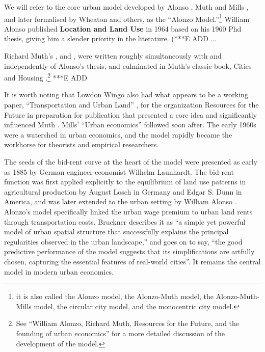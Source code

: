 We will refer to the core urban model developed by Alonso \cite{alonsoLocationLandUse1964}, Muth \cite{muthCitiesHousingSpatial1969} and Mills \cite{millsAggregativeModelResource1967}, and later formalised by Wheaton \cite{wheatonComparativeStaticAnalysis1974} and others, as the ``Alonzo Model.''\footnote{it is also called the Alonzo model, the Alonzo-Muth model, the Alonzo-Muth-Mills model, the circular city model, and the monocentric city model.} William Alonso published \textbf{Location and Land Use} in 1964  \cite{alonsoLocationLandUse1964} based on his 1960 Phd thesis,\cite{alonsoModelUrbanLand1960} 
giving him a slender priority in the literature.  (***E ADD ... %

Richard Muth's \cite{muthSpatialStructureHousing1961}, and \cite{muthRationalExpectationsTheory1961},  were written roughly simultaneously with and independently of Alonso's thesis, and  culminated in Muth's classic book, Cities and Housing  \cite{muthCitiesHousingSpatial1969}.\footnote{See ``William Alonzo, Richard Muth, Resources for  the Future, and the founding of urban economics''\cite{mcdonaldWilliamAlonsoRichard2007} for a more detailed discussion of the development of the model.}  ***E ADD %

It is worth noting that Lowdon Wingo also had what appears to be a working paper, ``Transportation and Urban Land'' \cite{wingoTransportationUrbanLand1961}, for the organization Resources for the Future  in preparation for publication that presented a core idea and  significantly influenced Muth \cite{mcdonaldWilliamAlonsoRichard2007}. Mills' ``Urban economics'' \cite{millsUrbanEconomics1972} followed soon after. The early 1960s were a watershed in urban economics, and the model rapidly became the workhorse for theorists and empirical researchers.

 The seeds of the bid-rent curve at the heart of the model were presented as early as 1885  by German engineer-economist Wilhelm Launhardt. \cite{blaugEconomicTheoryRetrospect1985, launhardtMathematischeBegruendungVolkswirthschaftslehre1885} The  \gls{bid-rent function} was first applied explicitly to the equilibrium of land use patterns in agricultural production by August Losch \cite{loschEconomicsLocation1954} in Germany and Edgar S. Dunn \cite{dunnEquilibriumLandUsePatterns1954} in America, and was later extended to the urban setting by William Alonso \cite{alonsoModelUrbanLand1960}. Alonzo's  model  specifically linked the urban wage premium to urban land rents through transportation costs.  Bruckner \cite{bruecknerStructureUrbanEquilibria1987} describes it as ``a simple yet powerful model of urban spatial structure that successfully explains the principal regularities observed in the urban landscape,'' and goes on to say, ``the good predictive performance of the model suggests that its simplifications are artfully chosen, capturing the essential features of real-world cities''. It remains the central model in modern urban economics.

